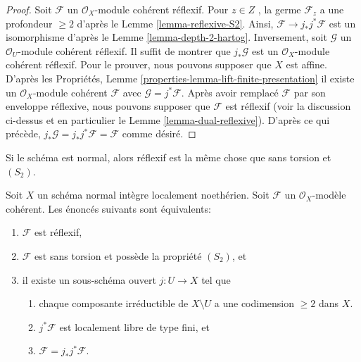 \begin{proof}
Soit  $\mathcal{F}$  un  $\mathcal{O}_X$-module cohérent réflexif. Pour  $z \in Z$ , la
germe  $\mathcal{F}_z$  a une profondeur  $\geq 2$  d'après le Lemme  \ref{lemma-reflexive-S2}.
Ainsi,  $\mathcal{F} \to j_*j^*\mathcal{F}$  est un isomorphisme d'après le Lemme  \ref{lemma-depth-2-hartog}.
Inversement, soit  $\mathcal{G}$  un  $\mathcal{O}_U$-module cohérent réflexif. Il suffit
de montrer que  $j_*\mathcal{G}$  est un  $\mathcal{O}_X$-module cohérent réflexif. Pour le
prouver, nous pouvons supposer que  $X$  est affine. D'après les
Propriétés, Lemme  \ref{properties-lemma-lift-finite-presentation}  il existe un  $\mathcal{O}_X$-module cohérent
 $\mathcal{F}$  avec  $\mathcal{G} = j^*\mathcal{F}$. Après avoir remplacé  $\mathcal{F}$  par son
enveloppe réflexive, nous pouvons supposer que  $\mathcal{F}$  est réflexif (voir la
discussion ci-dessus et en particulier le Lemme  \ref{lemma-dual-reflexive}). D'après ce qui
précède,  $j_*\mathcal{G} = j_*j^*\mathcal{F} = \mathcal{F}$  comme désiré.
\end{proof}

\noindent
Si le schéma est normal, alors réflexif est la même chose que sans torsion et
 $(S_2)$.

\begin{lemma}
\label{lemma-reflexive-over-normal}
Soit  $X$  un schéma normal intègre localement noethérien. Soit
 $\mathcal{F}$  un  $\mathcal{O}_X$-modèle cohérent. Les énoncés suivants sont
équivalents:
\begin{enumerate}
\item $\mathcal{F}$  est réflexif,
\item $\mathcal{F}$  est sans torsion et possède la propriété  $(S_2)$, et
\item il existe un sous-schéma ouvert  $j : U \to X$  tel que
\begin{enumerate}
\item chaque composante irréductible de  $X \setminus U$  a une codimension  $\geq 2$  dans
 $X$.
\item $j^*\mathcal{F}$  est localement libre de type fini, et
\item $\mathcal{F} = j_*j^*\mathcal{F}$.
\end{enumerate}
\end{enumerate}
\end{lemma}

